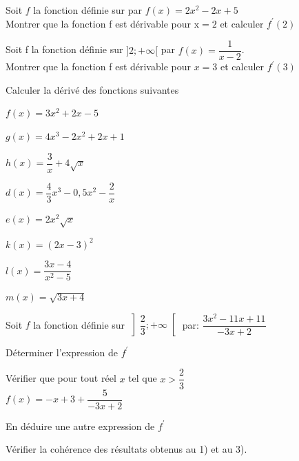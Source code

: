 \documentclass[12pt,a4paper]{article}  %
\begin{document}

Soit $f$ la fonction définie sur \R par $f(x)=2 x^{2}-2 x+5$\\
 Montrer que la fonction f est dérivable pour $\mathrm{x}=2$ et calculer $f^{\prime}(2)$

Soit f la fonction définie sur $] 2 ;+\infty[$ par $f(x)=\dfrac{1}{x-2}$.\\
Montrer que la fonction f est dérivable pour $x=3$ et calculer $f^{\prime}(3)$


Calculer la dérivé des fonctions suivantes
\begin{enumMet}
    \item $f(x)=3 x^{2}+2 x-5$
    \item {} $g(x)=4 x^{3}-2 x^{2}+2 x+1$
    \item $h(x)=\dfrac{3}{x}+4 \sqrt{x}$
    \item $d(x)=\dfrac{4}{3} x^{3}-0,5 x^{2}-\dfrac{2}{x}$
    \item $e(x)=2 x^{2} \sqrt{x}$
    \item {} $k(x)=(2 x-3)^{2}$
    \item $l(x)=\dfrac{3 x-4}{x^{2}-5}$
    \item $m(x)=\sqrt{3 x+4}$
\end{enumMet}

Soit $f$ la fonction définie sur $\left] \dfrac{2}{3} ;+\infty\right[$ par: $\dfrac{3 x^{2}-11 x+11}{-3 x+2}$
\begin{enumMet}
    \item Déterminer l'expression de $f^{\prime}$
    \item Vérifier que pour tout réel $x$ tel que $x>\dfrac{2}{3}$\\ $f(x)=-x+3+\dfrac{5}{-3 x+2}$
    \item En déduire une autre expression de $f^{\prime}$
    \item Vérifier la cohérence des résultats obtenus au 1) et au 3).
\end{enumMet}


\end{document}
